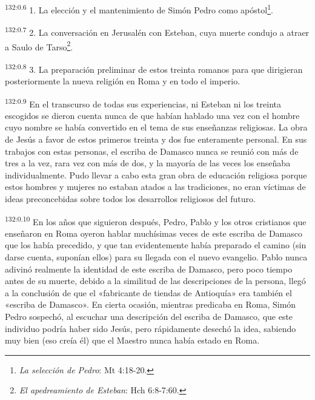 \par 
\textsuperscript{132:0.6} 1. La elección y el mantenimiento de Simón Pedro como apóstol\footnote{\textit{La selección de Pedro}: Mt 4:18-20.}.

\par 
\textsuperscript{132:0.7} 2. La conversación en Jerusalén con Esteban, cuya muerte condujo a atraer a Saulo de Tarso\footnote{\textit{El apedreamiento de Esteban}: Hch 6:8-7:60.}.

\par 
\textsuperscript{132:0.8} 3. La preparación preliminar de estos treinta romanos para que dirigieran posteriormente la nueva religión en Roma y en todo el imperio.

\par 
\textsuperscript{132:0.9} En el transcurso de todas sus experiencias, ni Esteban ni los treinta escogidos se dieron cuenta nunca de que habían hablado una vez con el hombre cuyo nombre se había convertido en el tema de sus enseñanzas religiosas. La obra de Jesús a favor de estos primeros treinta y dos fue enteramente personal. En sus trabajos con estas personas, el escriba de Damasco nunca se reunió con más de tres a la vez, rara vez con más de dos, y la mayoría de las veces los enseñaba individualmente. Pudo llevar a cabo esta gran obra de educación religiosa porque estos hombres y mujeres no estaban atados a las tradiciones, no eran víctimas de ideas preconcebidas sobre todos los desarrollos religiosos del futuro.

\par 
\textsuperscript{132:0.10} En los años que siguieron después, Pedro, Pablo y los otros cristianos que enseñaron en Roma oyeron hablar muchísimas veces de este escriba de Damasco que los había precedido, y que tan evidentemente había preparado el camino (sin darse cuenta, suponían ellos) para su llegada con el nuevo evangelio. Pablo nunca adivinó realmente la identidad de este escriba de Damasco, pero poco tiempo antes de su muerte, debido a la similitud de las descripciones de la persona, llegó a la conclusión de que el «fabricante de tiendas de Antioquía» era también el «escriba de Damasco». En cierta ocasión, mientras predicaba en Roma, Simón Pedro sospechó, al escuchar una descripción del escriba de Damasco, que este individuo podría haber sido Jesús, pero rápidamente desechó la idea, sabiendo muy bien (eso creía él) que el Maestro nunca había estado en Roma.

